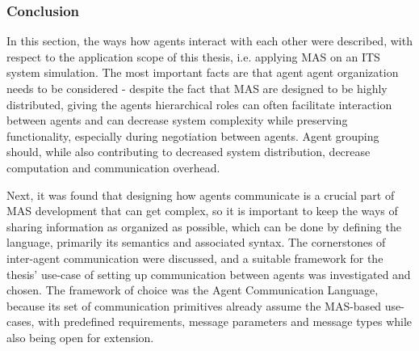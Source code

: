 \documentclass[main.tex]{subfiles}
\begin{document}
\subsubsection{Conclusion}

In this section, the ways how agents interact with each other were described, with respect to the
application scope of this thesis, i.e. applying MAS on an ITS system simulation. The most important
facts are that agent agent organization needs to be considered - despite the fact that MAS are
designed to be highly distributed, giving the agents hierarchical roles can often facilitate
interaction between agents and can decrease system complexity while preserving functionality,
especially during negotiation between agents. Agent grouping should, while also contributing to
decreased system distribution, decrease computation and communication overhead. 

Next, it was found that designing how agents communicate is a crucial part of MAS development
that can get complex, so it is important to keep the ways of sharing information as organized
as possible, which can be done by defining the language, primarily its semantics and associated
syntax.  The cornerstones of inter-agent communication were discussed, and a suitable framework
for the thesis' use-case of setting up communication between agents was investigated and
chosen. The framework of choice was the Agent Communication Language, because its set of
communication primitives already assume the MAS-based use-cases, with predefined requirements,
message parameters and message types while also being open for extension.
\end{document}
